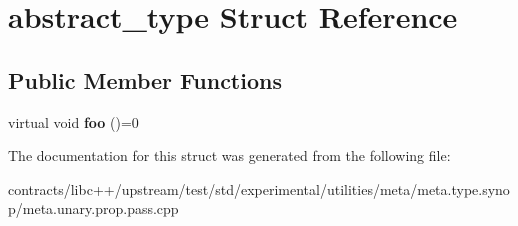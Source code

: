 \hypertarget{structabstract__type}{}\section{abstract\+\_\+type Struct Reference}
\label{structabstract__type}
\subsection*{Public Member Functions}
\begin{DoxyCompactItemize}
\item 
\mbox{\label{structabstract__type_a420229fa2a193d25b3795a498f8ce01c}} 
virtual void {\bfseries foo} ()=0
\end{DoxyCompactItemize}


The documentation for this struct was generated from the following file\+:\begin{DoxyCompactItemize}
\item 
contracts/libc++/upstream/test/std/experimental/utilities/meta/meta.\+type.\+synop/meta.\+unary.\+prop.\+pass.\+cpp\end{DoxyCompactItemize}
